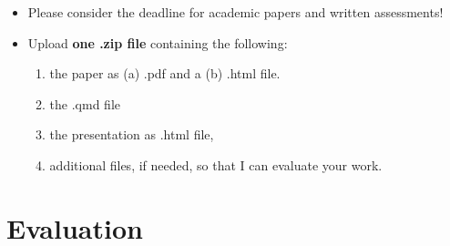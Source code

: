\documentclass[
  a4paper,
  onecolumn,
  oneside]{scrartcl}
\providecommand{\tightlist}{%
  \setlength{\itemsep}{0pt}\setlength{\parskip}{0pt}}\usepackage{longtable,booktabs,array}
\begin{document}
\begin{itemize}
\tightlist
\item
  Please consider the deadline for academic papers and written
  assessments!
\item
  Upload \textbf{one .zip file} containing the following:

  \begin{enumerate}
  \def\labelenumi{\arabic{enumi}.}
  \tightlist
  \item
    the paper as (a) .pdf and a (b) .html file.
  \item
    the .qmd file
  \item
    the presentation as .html file,
  \item
    additional files, if needed, so that I can evaluate your work.
  \end{enumerate}
\end{itemize}

\section{Evaluation}\label{evaluation}
\end{document}
